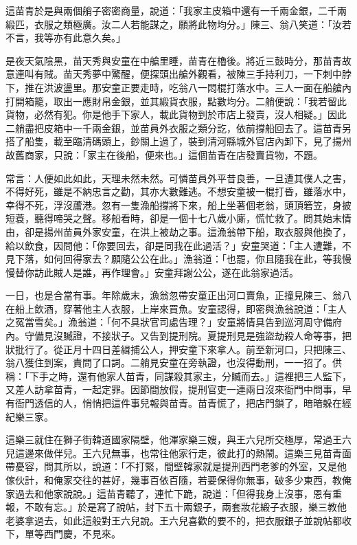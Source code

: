 這苗青於是與兩個艄子密密商量，說道：「我家主皮箱中還有一千兩金銀，二千兩緞匹，衣服之類極廣。汝二人若能謀之，願將此物均分。」陳三、翁八笑道：「汝若不言，我等亦有此意久矣。」

是夜天氣陰黑，苗天秀與安童在中艙里睡，苗青在櫓後。將近三鼓時分，那苗青故意連叫有賊。苗天秀夢中驚醒，便探頭出艙外觀看，被陳三手持利刀，一下刺中脖下，推在洪波盪里。那安童正要走時，吃翁八一悶棍打落水中。三人一面在船艙內打開箱籠，取出一應財帛金銀，並其緞貨衣服，點數均分。二艄便說：「我若留此貨物，必然有犯。你是他手下家人，載此貨物到於市店上發賣，沒人相疑。」因此二艄盡把皮箱中一千兩金銀，並苗員外衣服之類分訖，依前撐船回去了。這苗青另搭了船隻，載至臨清碼頭上，鈔關上過了，裝到清河縣城外官店內卸下，見了揚州故舊商家，只說：「家主在後船，便來也。」這個苗青在店發賣貨物，不題。

常言：人便如此如此，天理未然未然。可憐苗員外平昔良善，一旦遭其僕人之害，不得好死，雖是不納忠言之勸，其亦大數難逃。不想安童被一棍打昏，雖落水中，幸得不死，浮沒蘆港。忽有一隻漁船撐將下來，船上坐著個老翁，頭頂箬笠，身披短蓑，聽得啼哭之聲。移船看時，卻是一個十七八歲小廝，慌忙救了。問其始末情由，卻是揚州苗員外家安童，在洪上被劫之事。這漁翁帶下船，取衣服與他換了，給以飲食，因問他：「你要回去，卻是同我在此過活？」安童哭道：「主人遭難，不見下落，如何回得家去？願隨公公在此。」漁翁道：「也罷，你且隨我在此，等我慢慢替你訪此賊人是誰，再作理會。」安童拜謝公公，遂在此翁家過活。

一日，也是合當有事。年除歲末，漁翁忽帶安童正出河口賣魚，正撞見陳三、翁八在船上飲酒，穿著他主人衣服，上岸來買魚。安童認得，即密與漁翁說道：「主人之冤當雪矣。」漁翁道：「何不具狀官司處告理？」安童將情具告到巡河周守備府內。守備見沒贓證，不接狀子。又告到提刑院。夏提刑見是強盜劫殺人命等事，把狀批行了。從正月十四日差緝捕公人，押安童下來拿人。前至新河口，只把陳三、翁八獲住到案，責問了口詞。二艄見安童在旁執證，也沒得動刑，一一招了。供稱：「下手之時，還有他家人苗青，同謀殺其家主，分贓而去。」這裡把三人監下，又差人訪拿苗青，一起定罪。因節間放假，提刑官吏一連兩日沒來衙門中問事，早有衙門透信的人，悄悄把這件事兒報與苗青。苗青慌了，把店門鎖了，暗暗躲在經紀樂三家。

這樂三就住在獅子街韓道國家隔壁，他渾家樂三嫂，與王六兒所交極厚，常過王六兒這邊來做伴兒。王六兒無事，也常往他家行走，彼此打的熱鬧。這樂三見苗青面帶憂容，問其所以，說道：「不打緊，間壁韓家就是提刑西門老爹的外室，又是他傢伙計，和俺家交往的甚好，幾事百依百隨，若要保得你無事，破多少東西，教俺家過去和他家說說。」這苗青聽了，連忙下跪，說道：「但得我身上沒事，恩有重報，不敢有忘。」於是寫了說帖，封下五十兩銀子，兩套妝花緞子衣服，樂三教他老婆拿過去，如此這般對王六兒說。王六兒喜歡的要不的，把衣服銀子並說帖都收下，單等西門慶，不見來。

